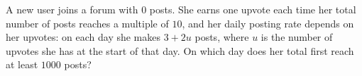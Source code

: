A new user joins a forum with $0$ posts. She earns one upvote each time her total number of posts reaches a multiple of $10$, and her daily posting rate depends on her upvotes: on each day she makes $3+2u$ posts, where $u$ is the number of upvotes she has at the start of that day. On which day does her total first reach at least $1000$ posts?
